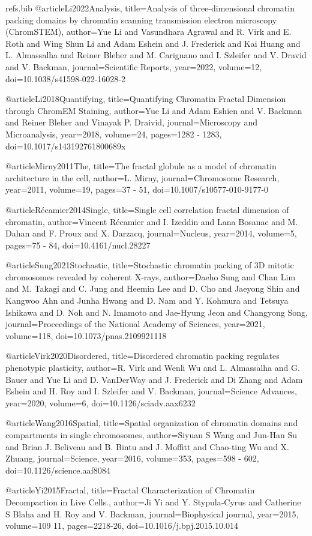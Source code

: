 \begin{filecontents}{refs.bib}
@article{Li2022Analysis,
title={Analysis of three-dimensional chromatin packing domains by chromatin scanning transmission electron microscopy (ChromSTEM)},
author={Yue Li and Vasundhara Agrawal and R. Virk and E. Roth and Wing Shun Li and Adam Eshein and J. Frederick and Kai Huang and L. Almassalha and Reiner Bleher and M. Carignano and I. Szleifer and V. Dravid and V. Backman},
journal={Scientific Reports},
year={2022},
volume={12},
doi={10.1038/s41598-022-16028-2}
}

@article{Li2018Quantifying,
title={Quantifying Chromatin Fractal Dimension through ChromEM Staining},
author={Yue Li and Adam Eshien and V. Backman and Reiner Bleher and Vinayak P. Draivid},
journal={Microscopy and Microanalysis},
year={2018},
volume={24},
pages={1282 - 1283},
doi={10.1017/s143192761800689x}
}

@article{Mirny2011The,
title={The fractal globule as a model of chromatin architecture in the cell},
author={L. Mirny},
journal={Chromosome Research},
year={2011},
volume={19},
pages={37 - 51},
doi={10.1007/s10577-010-9177-0}
}

@article{Récamier2014Single,
title={Single cell correlation fractal dimension of chromatin},
author={Vincent Récamier and I. Izeddin and Lana Bosanac and M. Dahan and F. Proux and X. Darzacq},
journal={Nucleus},
year={2014},
volume={5},
pages={75 - 84},
doi={10.4161/nucl.28227}
}

@article{Sung2021Stochastic,
title={Stochastic chromatin packing of 3D mitotic chromosomes revealed by coherent X-rays},
author={Daeho Sung and Chan Lim and M. Takagi and C. Jung and Heemin Lee and D. Cho and Jaeyong Shin and Kangwoo Ahn and Junha Hwang and D. Nam and Y. Kohmura and Tetsuya Ishikawa and D. Noh and N. Imamoto and Jae-Hyung Jeon and Changyong Song},
journal={Proceedings of the National Academy of Sciences},
year={2021},
volume={118},
doi={10.1073/pnas.2109921118}
}

@article{Virk2020Disordered,
title={Disordered chromatin packing regulates phenotypic plasticity},
author={R. Virk and Wenli Wu and L. Almassalha and G. Bauer and Yue Li and D. VanDerWay and J. Frederick and Di Zhang and Adam Eshein and H. Roy and I. Szleifer and V. Backman},
journal={Science Advances},
year={2020},
volume={6},
doi={10.1126/sciadv.aax6232}
}

@article{Wang2016Spatial,
title={Spatial organization of chromatin domains and compartments in single chromosomes},
author={Siyuan S Wang and Jun-Han Su and Brian J. Beliveau and B. Bintu and J. Moffitt and Chao-ting Wu and X. Zhuang},
journal={Science},
year={2016},
volume={353},
pages={598 - 602},
doi={10.1126/science.aaf8084}
}

@article{Yi2015Fractal,
title={Fractal Characterization of Chromatin Decompaction in Live Cells.},
author={Ji Yi and Y. Stypula‐Cyrus and Catherine S Blaha and H. Roy and V. Backman},
journal={Biophysical journal},
year={2015},
volume={109 11},
pages={2218-26},
doi={10.1016/j.bpj.2015.10.014}
}
\end{filecontents}

